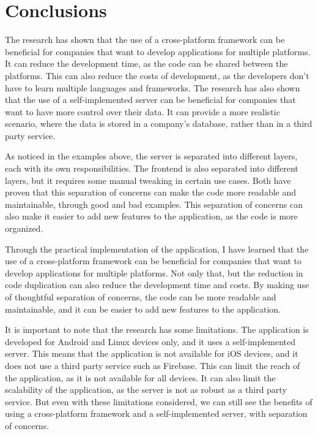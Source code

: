\chapter{Conclusions}

The research has shown that the use of a cross-platform framework can be beneficial for companies that want to develop applications for multiple platforms.
It can reduce the development time, as the code can be shared between the platforms.
This can also reduce the costs of development, as the developers don't have to learn multiple languages and frameworks.
The research has also shown that the use of a self-implemented server can be beneficial for companies that want to have more control over their data.
It can provide a more realistic scenario, where the data is stored in a company's database, rather than in a third party service.

\par
As noticed in the examples above, the server is separated into different layers, each with its own responsibilities.
The frontend is also separated into different layers, but it requires some manual tweaking in certain use cases.
Both have proven that this separation of concerns can make the code more readable and maintainable, through good and bad examples.
This separation of concerns can also make it easier to add new features to the application, as the code is more organized.

\par
Through the practical implementation of the application, I have learned that the use of a cross-platform framework can be beneficial for companies that want to develop applications for multiple platforms.
Not only that, but the reduction in code duplication can also reduce the development time and costs.
By making use of thoughtful separation of concerns, the code can be more readable and maintainable, and it can be easier to add new features to the application.

\par
It is important to note that the research has some limitations.
The application is developed for Android and Linux devices only, and it uses a self-implemented server.
This means that the application is not available for iOS devices, and it does not use a third party service such as Firebase.
This can limit the reach of the application, as it is not available for all devices.
It can also limit the scalability of the application, as the server is not as robust as a third party service.
But even with these limitations considered, we can still see the benefits of using a cross-platform framework and a self-implemented server, with separation of concerns.


\label{conclusions}
